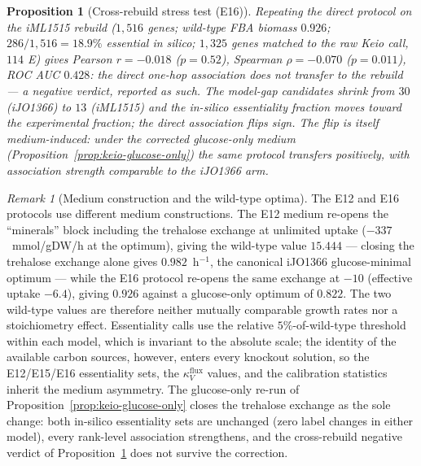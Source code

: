 \documentclass[11pt,a4paper]{article}
\theoremstyle{plain}
\newtheorem{proposition}[theorem]{Proposition}
\theoremstyle{definition}
\theoremstyle{remark}
\newtheorem{remark}[theorem]{Remark}
\begin{document}
\begin{proposition}[Cross-rebuild stress test (E16)]
\label{prop:keio-e16}
Repeating the direct protocol on the iML1515 rebuild ($1{,}516$
genes; wild-type FBA biomass $0.926$; $286/1{,}516=18.9\%$
essential in silico; $1{,}325$ genes matched to the raw Keio call,
$114$ E) gives Pearson $r=-0.018$ ($p=0.52$), Spearman
$\rho=-0.070$ ($p=0.011$), ROC AUC $0.428$: the direct one-hop
association does \emph{not} transfer to the rebuild --- a negative
verdict, reported as such. The model-gap candidates shrink from
$30$ (iJO1366) to $13$ (iML1515) and the in-silico essentiality fraction moves toward the experimental
fraction; the direct association flips sign. The flip is itself
medium-induced: under the corrected glucose-only medium
(Proposition~\ref{prop:keio-glucose-only}) the same protocol
transfers positively, with association strength comparable to the
iJO1366 arm.
\end{proposition}

\begin{remark}[Medium construction and the wild-type optima]
\label{rem:keio-medium}
The E12 and E16 protocols use different medium constructions. The
E12 medium re-opens the ``minerals'' block including the trehalose
exchange at unlimited uptake ($-337$~mmol/gDW/h at the optimum),
giving the wild-type value $15.444$ --- closing the trehalose
exchange alone gives $0.982$~h$^{-1}$, the canonical iJO1366
glucose-minimal optimum --- while the E16 protocol re-opens the same
exchange at $-10$ (effective uptake $-6.4$), giving $0.926$ against
a glucose-only optimum of $0.822$. The two wild-type values are
therefore neither mutually comparable growth rates nor a
stoichiometry effect. Essentiality calls use the relative
$5\%$-of-wild-type threshold within each model, which is invariant
to the absolute scale; the identity of the available carbon sources,
however, enters every knockout solution, so the E12/E15/E16
essentiality sets, the $\kappa^{\mathrm{flux}}_V$ values, and the
calibration statistics inherit the medium asymmetry. The
glucose-only re-run of Proposition~\ref{prop:keio-glucose-only}
closes the trehalose exchange as the sole change: both in-silico
essentiality sets are unchanged (zero label changes in either
model), every rank-level association strengthens, and the
cross-rebuild negative verdict of Proposition~\ref{prop:keio-e16}
does not survive the correction.
\end{remark}
\end{document}
